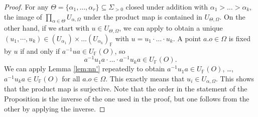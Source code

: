 \documentclass[12pt]{amsart}
\newcommand{\F}{\mathbb{F} }
\newcommand{\frakg}{\mathfrak{g}}
\numberwithin{equation}{section}
\theoremstyle{remark} %
\begin{document}
		\begin{proof}
			For any $\Theta = \{\alpha_1, \ldots, \alpha_r\} \subseteq \Sigma_{>0}$ closed under addition with $\alpha_1 > \ldots > \alpha_k$, the image of $\prod_{\alpha \in \Theta} U_{\alpha,\Omega} $ under the product map is contained in $U_{\Theta,\Omega}$. On the other hand, if we start with $u \in U_{\Theta, \Omega}$, we can apply \cite[Lemma \ref{I-lem:BCH_consequence}]{AppAGRCF} to obtain a unique $(u_1, \cdots , u_k) \in (U_{\alpha_1}) \times \ldots (U_{\alpha_k})_\F $ with $u = u_1 \cdot \ldots \cdot u_k$. A point $a.o \in \Omega$ is fixed by $u$ if and only if $a^{-1}ua \in U_\F(O)$, so
			$$
			a^{-1}u_1a \cdot \ldots \cdot a^{-1}u_k a \in U_\F(O).
			$$
			We can apply Lemma \ref{lem:nn'} repeatedly to obtain $a^{-1}u_1a \in U_\F(O)$, \ldots, $a^{-1}u_ka \in U_\F(O)$ for all $a.o \in \Omega$. This exactly means that $u_i \in U_{\alpha,\Omega}$. This shows that the product map is surjective. Note that the order in the statement of the Proposition is the inverse of the one used in the proof, but one follows from the other by applying the inverse.
		\end{proof}
\end{document}
